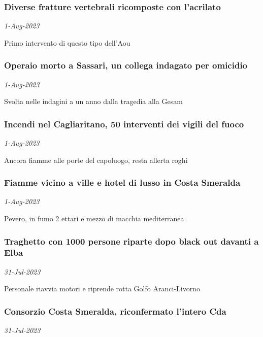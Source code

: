 \subsubsection{Diverse fratture vertebrali ricomposte con l'acrilato \href{https://www.ansa.it/sardegna/notizie/2023/08/01/diverse-fratture-vertebrali-ricomposte-con-lacrilito_96449dc9-5350-4edb-b0cc-ed36fac48baa.html}{}}
\textit{1-Aug-2023}

Primo intervento di questo tipo dell'Aou
\subsubsection{Operaio morto a Sassari, un collega indagato per omicidio \href{https://www.ansa.it/sardegna/notizie/2023/08/01/operaio-morto-a-sassari-un-collega-indagato-per-omicidio_b25db6bb-3115-4777-a996-f74b4bc12270.html}{}}
\textit{1-Aug-2023}

Svolta nelle indagini a un anno dalla tragedia alla Gesam
\subsubsection{Incendi nel Cagliaritano, 50 interventi dei vigili del fuoco \href{https://www.ansa.it/sardegna/notizie/2023/08/01/incendi-nel-cagliaritano-50-interventi-dei-vigili-del-fuoco_2dbcf173-401b-4236-8609-ddd528f90e70.html}{}}
\textit{1-Aug-2023}

Ancora fiamme alle porte del capoluogo, resta allerta roghi
\subsubsection{Fiamme vicino a ville e hotel di lusso in Costa Smeralda \href{https://www.ansa.it/sardegna/notizie/2023/08/01/fiamme-vicino-a-ville-ed-hotel-di-lusso-in-costa-smeralda_f03f1368-7713-4979-a3fe-335a7d591f13.html}{}}
\textit{1-Aug-2023}

Pevero, in fumo 2 ettari e mezzo di macchia mediterranea
\subsubsection{Traghetto con 1000 persone riparte dopo black out davanti a Elba \href{https://www.ansa.it/sardegna/notizie/2023/07/31/traghetto-con-1000-persone-riparte-dopo-black-out-davanti-a-elba_dac0e117-687c-4351-8d22-160997d21fcd.html}{}}
\textit{31-Jul-2023}

Personale riavvia motori e riprende rotta Golfo Aranci-Livorno
\subsubsection{Consorzio Costa Smeralda, riconfermato l'intero Cda \href{https://www.ansa.it/sardegna/notizie/2023/07/31/consorzio-costa-smeralda-riconfermato-lintero-cda_35b87932-cb39-46c5-8cf4-56d1ef5a2561.html}{}}
\textit{31-Jul-2023}

